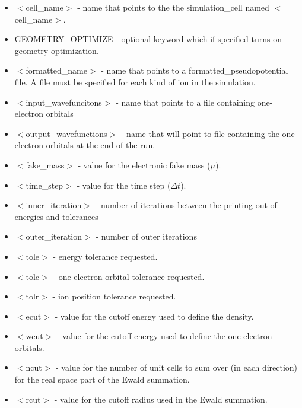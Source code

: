 \begin{itemize}
	\item $<$cell\_name$>$ - name that points to the
              the simulation\_cell named $<$cell\_name$>$.
	\item GEOMETRY\_OPTIMIZE - optional keyword which if specified
	      turns on geometry optimization. 	
	\item $<$formatted\_name$>$ - name that points
              to a formatted\_pseudopotential file.  A file must
              be specified for each kind of ion in the simulation.
	\item $<$input\_wavefuncitons$>$ - name that points
              to a file containing one-electron orbitals
	\item $<$output\_wavefunctions$>$ - name that will
              point to file containing the one-electron orbitals at the
              end of the run. 
	\item $<$fake\_mass$>$ - value for the electronic
              fake mass ($\mu$).
	\item $<$time\_step$>$ - value for the time step ($\Delta t$).
	\item $<$inner\_iteration$>$ - number of iterations between the 
              printing out of energies and tolerances
	\item $<$outer\_iteration$>$ - number of outer iterations
 	\item $<$tole$>$ - energy tolerance requested.
	\item $<$tolc$>$ - one-electron orbital tolerance requested.
	\item $<$tolr$>$ - ion position tolerance requested.
	\item $<$ecut$>$ - value for the cutoff energy used
                           to define the density.
	\item $<$wcut$>$ - value for the cutoff energy used
 			   to define the one-electron orbitals.
	\item $<$ncut$>$ - value for the number of unit cells
 			  to sum over (in each direction) for the real space
			  part of the Ewald summation.
	\item $<$rcut$>$ - value for the cutoff radius used
			  in the Ewald summation.
\end{itemize}



